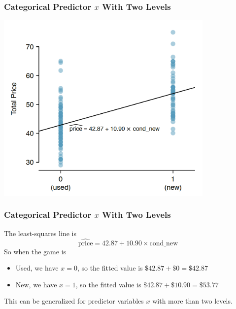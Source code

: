 \documentclass[handout]{beamer}
\begin{document}
\begin{frame}[fragile]
\frametitle{Categorical Predictor $x$ With Two Levels}

\begin{center}
\includegraphics[width=0.8\textwidth]{figure/mario_kart.png}
\end{center}

\end{frame}


\begin{frame}[fragile]
\frametitle{Categorical Predictor $x$ With Two Levels}
%
%
The least-squares line is
\[
\widehat{\mbox{price}} = 42.87 + 10.90 \times \mbox{cond\_new}
\]
\pause
So when the game is
\begin{itemize}
\item Used, we have $x=0$, so the fitted value is $\$42.87 + \$0 = \$42.87$
\item New, we have $x=1$, so the fitted value is $\$42.87 + \$10.90 = \$53.77$
\end{itemize}
\pause
This can be generalized for predictor variables $x$ with more than two levels.

\end{frame}
\end{document}
